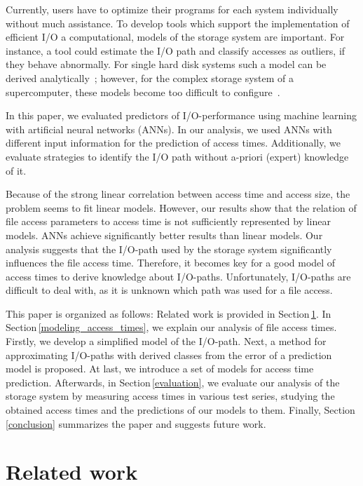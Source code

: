 \documentclass{superfri}
\begin{document}
Currently, users have to optimize their programs for each system individually without much assistance.
To develop tools which support the implementation of efficient I/O a computational, models of the storage system are important.
For instance, a tool could estimate the I/O path and classify accesses as outliers, if they behave abnormally.
For single hard disk systems such a model can be derived analytically~\cite{Ruemmler94anintroduction}; however, for the complex storage system of a supercomputer, these models become too difficult to configure~\cite{DBLP:conf/npc/ZhangLZJC10}.

In this paper, we evaluated predictors of I/O-performance using machine learning with artificial neural networks (ANNs).
In our analysis, we used ANNs with different input information for the prediction of access times.
Additionally, we evaluate strategies to identify the I/O path without a-priori (expert) knowledge of it.

Because of the strong linear correlation between access time and access size, the problem seems to fit linear models.
However, our results show that the relation of file access parameters to access time is not sufficiently represented by linear models.
ANNs achieve significantly better results than linear models.
Our analysis suggests that the I/O-path used by the storage system significantly influences the file access time.
Therefore, it becomes key for a good model of access times to derive knowledge about I/O-paths.
Unfortunately, I/O-paths are difficult to deal with, as it is unknown which path was used for a file access.

This paper is organized as follows:
Related work is provided in Section\,\ref{sec:related}.
In Section\,\ref{modeling_access_times}, we explain our analysis of file access times. 
Firstly, we develop a simplified model of the I/O-path. 
Next, a method for approximating I/O-paths with derived classes from the error of a prediction model is proposed. 
At last, we introduce a set of models for access time prediction.
Afterwards, in Section\,\ref{evaluation}, we evaluate our analysis of the storage system by measuring access times in various test series, studying the obtained access times and the predictions of our models to them.
Finally, Section\,\ref{conclusion} summarizes the paper and suggests future work.

\section{Related work}
\label{sec:related}
\end{document}
